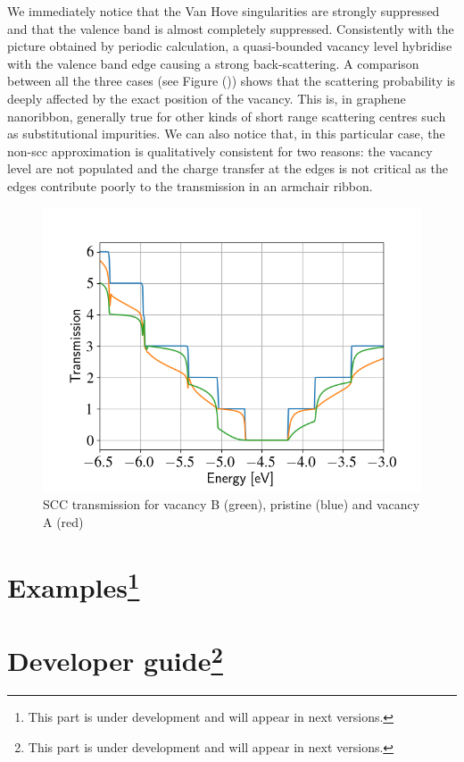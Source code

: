\documentclass[a4paper,11pt,english]{sphinxmanual}
\begin{document}
{{We immediately notice that the Van Hove singularities are strongly
suppressed and that the valence band is almost completely
suppressed. Consistently with the picture obtained by periodic
calculation, a quasi-bounded vacancy level hybridise with the valence
band edge causing a strong back-scattering. A comparison between all
the three cases (see Figure {\hyperref[transport:fig-scc-tunn-comparison]{\emph{}}} ()) shows that
the scattering probability is deeply affected by the exact position of
the vacancy. This is, in graphene nanoribbon, generally true for other
kinds of short range scattering centres such as substitutional
impurities. We can also notice that, in this particular case, the
non-scc approximation is qualitatively consistent for two reasons: the
vacancy level are not populated and the charge transfer at the edges
is not critical as the edges contribute poorly to the transmission in
an armchair ribbon.
\begin{figure}[htbp]
\centering
\capstart
\includegraphics[width=0.700\linewidth]{scc-tunn-comparison.png}
\caption{SCC transmission for vacancy B (green), pristine (blue) and vacancy A (red)}\label{transport:fig-scc-tunn-comparison}\end{figure}

\part[Examples]{Examples\footnote{This part is under development and will appear in next versions.}}

\part[Developer guide]{Developer guide\footnote{This part is under development and will appear in next versions.}}

}}
\end{document}
